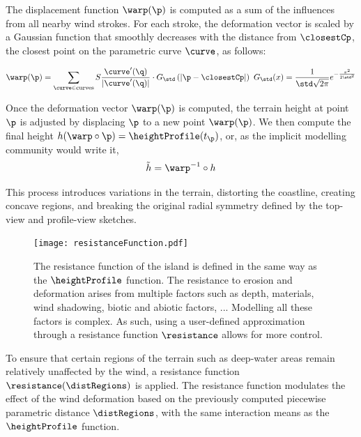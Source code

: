 The displacement function $\warp(\p)$ is computed as a sum of the influences from all nearby wind strokes. For each stroke, the deformation vector is scaled by a Gaussian function that smoothly decreases with the distance from $\closestCp$, the closest point on the parametric curve $\curve$, as follows:

\begin{align}
\warp(\p) = \sum_{\curve \in \text{curves}} S \frac{\curve'(\q)}{| \curve'(\q) | } \cdot G_\std\left(| \p - \closestCp | \right) %
\
G_\std(x) = \frac{1}{\std \sqrt{2\pi}} e^{-\frac{x^2}{2 \std^2}}
\end{align}

Once the deformation vector $\warp(\p)$ is computed, the terrain height at point $\p$ is adjusted by displacing $\p$ to a new point $\warp(\p)$.
We then compute the final height $h(\warp \circ \p) = \heightProfile(t_{\p})$, or, as the implicit modelling community would write it,
\begin{align}
\Tilde{h} = \warp^{-1} \circ h
\end{align}

This process introduces variations in the terrain, distorting the coastline, creating concave regions, and breaking the original radial symmetry defined by the top-view and profile-view sketches.


\begin{figure}[H]
\centering
\texttt{[image: resistanceFunction.pdf]}
\caption{The resistance function of the island is defined in the same way as the $\heightProfile$ function. The resistance to erosion and deformation arises from multiple factors such as depth, materials, wind shadowing, biotic and abiotic factors, ... Modelling all these factors is complex. As such, using a user-defined approximation through a resistance function $\resistance$ allows for more control.}
\label{fig:coral-island-resistance-function}
\end{figure}

To ensure that certain regions of the terrain such as deep-water areas remain relatively unaffected by the wind, a resistance function $\resistance(\distRegions)$ is applied. The resistance function modulates the effect of the wind deformation based on the previously computed piecewise parametric distance $\distRegions$, with the same interaction means as the $\heightProfile$ function.


